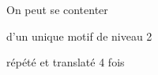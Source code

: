 \documentclass[preview]{standalone}
\begin{document}
\begin{center}
On peut se contenter 
    
  d'un unique motif de niveau 2 
  
  répété et translaté 4 fois
\end{center}
\end{document}
